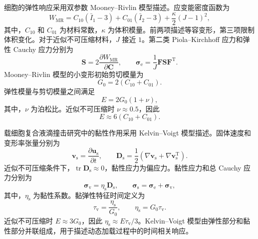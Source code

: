 细胞的弹性响应采用双参数 Mooney--Rivlin 模型描述。应变能密度函数为
\begin{equation}
W_{\mathrm{MR}}
=
C_{10}\left(\bar I_1-3\right)
+
C_{01}\left(\bar I_2-3\right)
+
\frac{\kappa}{2}\left(J-1\right)^2,
\label{eq:ch2_mooney_rivlin}
\end{equation}
其中，$C_{10}$ 和 $C_{01}$ 为材料常数，$\kappa$ 为体积模量。前两项描述等容变形，第三项限制体积变化。对于近似不可压缩材料，$J$ 接近 $1$\cite{mooney1940large,rivlin1948large}。第二类 Piola--Kirchhoff 应力和弹性 Cauchy 应力分别为
\begin{equation}
\boldsymbol{S}
=
2\frac{\partial W_{\mathrm{MR}}}{\partial\boldsymbol{C}},
\qquad
\boldsymbol{\sigma}_{\mathrm e}
=
\frac{1}{J}
\boldsymbol{F}\boldsymbol{S}\boldsymbol{F}^{\mathrm T}.
\label{eq:ch2_hyperelastic_stress}
\end{equation}
Mooney--Rivlin 模型的小变形初始剪切模量为
\begin{equation}
G_0=2\left(C_{10}+C_{01}\right).
\label{eq:ch2_initial_shear_modulus}
\end{equation}
弹性模量与剪切模量之间满足
\begin{equation}
E=2G_0(1+\nu),
\label{eq:ch2_elastic_shear_relation}
\end{equation}
其中，$\nu$ 为泊松比。近似不可压缩时 $\nu\approx0.5$，因此
\begin{equation}
E\approx6\left(C_{10}+C_{01}\right).
\label{eq:ch2_mr_modulus_relation}
\end{equation}

载细胞复合液滴撞击研究中的黏性作用采用 Kelvin--Voigt 模型描述。固体速度和变形率张量分别为
\begin{equation}
\boldsymbol{v}_{\mathrm s}
=
\frac{\partial\boldsymbol{u}_{\mathrm s}}{\partial t},
\qquad
\boldsymbol{D}_{\mathrm s}
=
\frac{1}{2}
\left(
\nabla\boldsymbol{v}_{\mathrm s}
+
\nabla\boldsymbol{v}_{\mathrm s}^{\mathrm T}
\right).
\label{eq:ch2_solid_rate}
\end{equation}
近似不可压缩条件下，$\operatorname{tr}\boldsymbol{D}_{\mathrm s}\approx0$，黏性应力为偏应力。黏性应力和总 Cauchy 应力分别为
\begin{equation}
\boldsymbol{\sigma}_{\mathrm v}
=
\eta_{\mathrm s}\boldsymbol{D}_{\mathrm s},
\qquad
\boldsymbol{\sigma}_{\mathrm s}
=
\boldsymbol{\sigma}_{\mathrm e}
+
\boldsymbol{\sigma}_{\mathrm v},
\label{eq:ch2_kelvin_voigt_3d}
\end{equation}
其中，$\eta_{\mathrm s}$ 为黏性系数。黏弹性特征时间定义为
\begin{equation}
\tau_{\mathrm v}
=
\frac{\eta_{\mathrm s}}{G_0},
\qquad
\eta_{\mathrm s}=G_0\tau_{\mathrm v}.
\label{eq:ch2_kelvin_voigt_time}
\end{equation}
近似不可压缩时 $E\approx3G_0$，因此 $\eta_{\mathrm s}\approx E\tau_{\mathrm v}/3$。Kelvin--Voigt 模型由弹性部分和黏性部分并联组成，用于描述动态加载过程中的时间相关响应\cite{christensen1982theory,lakes1998viscoelastic}。

